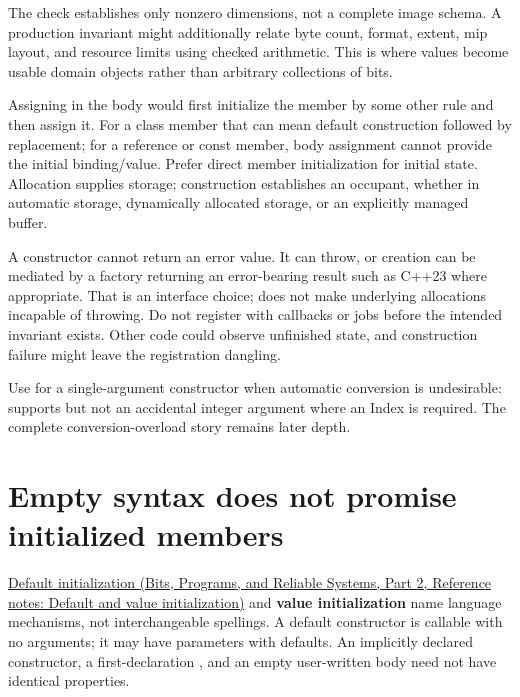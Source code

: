 The check establishes only nonzero dimensions, not a complete image schema. A production invariant might additionally relate byte count, format, extent, mip layout, and resource limits using checked arithmetic. This is where values become usable domain objects rather than arbitrary collections of bits.

Assigning  in the body would first initialize the member by some other rule and then assign it. For a class member that can mean default construction followed by replacement; for a reference or const member, body assignment cannot provide the initial binding/value. Prefer direct member initialization for initial state. Allocation supplies storage; construction establishes an occupant, whether in automatic storage, dynamically allocated storage, or an explicitly managed buffer.

A constructor cannot return an error value. It can throw, or creation can be mediated by a factory returning an error-bearing result such as C++23  where appropriate. That is an interface choice;  does not make underlying allocations incapable of throwing. Do not register  with callbacks or jobs before the intended invariant exists. Other code could observe unfinished state, and construction failure might leave the registration dangling.

Use  for a single-argument constructor when automatic conversion is undesirable:  supports  but not an accidental integer argument where an Index is required. The complete conversion-overload story remains later depth.

\section{Empty syntax does not promise initialized members}\label{05-engine-i-ch003-empty-syntax-does-not-promise-initialized-members}

\hypertarget{05-engine-i-ch003-empty-syntax-does-not-promise-initialized-members}{}

\href{../01-Bits-Programs-and-Reliable-Systems-P02/main.pdf\#nameddest=appendix-ba8c1a9fe03f}{Default initialization (Bits, Programs, and Reliable Systems, Part 2, Reference notes: Default and value initialization)} and \textbf{value initialization} name language mechanisms, not interchangeable spellings. A default constructor is callable with no arguments; it may have parameters with defaults. An implicitly declared constructor, a first-declaration , and an empty user-written body need not have identical properties.


